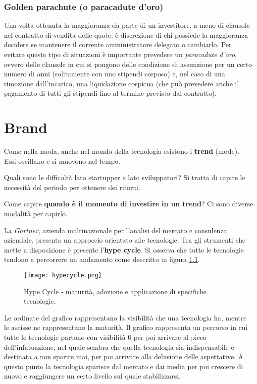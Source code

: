 \subsection{Golden parachute (o paracadute d'oro)}
Una volta ottenuta la maggioranza da parte di un investitore, a meno di
clausole nel contratto di vendita delle quote, è discrezione di chi possiede la
maggioranza decidere se mantenere il corrente amministratore delegato o
cambiarlo. Per evitare questo tipo di situazioni è importante prevedere un
\textit{paracadute d'oro}, ovvero delle clausole in cui si pongono delle
condizione di assunzione per un certo numero di anni (solitamente con uno
stipendi corposo) e, nel caso di una rimozione dall'incarico, una liquidazione
cospicua (che può prevedere anche il pagamento di tutti gli stipendi fino al
termine previsto dal contratto).

\chapter{Brand}

Come nella moda, anche nel mondo della tecnologia esistono i \textbf{trend}
(mode). Essi oscillano e si muovono nel tempo.

Quali sono le difficoltà lato startupper e lato sviluppatori? Si tratta di
capire le necessità del periodo per ottenere dei ritorni.

Come capire \textbf{quando è il momento di investire in un trend}?
Ci sono diverse modalità per capirlo.

La \textit{Gartner}, azienda multinazionale per l'analisi del mercato e
consulenza aziendale, presenta un approccio orientato alle tecnologie. Tra gli
strumenti che mette a disposizione è presente l'\textbf{hype cycle}.
Si osserva che tutte le tecnologie tendono a percorrere un andamento come
descritto in figura \ref{fig:hypecycle}.

\begin{figure}[H]
\centering
\texttt{[image: hypecycle.png]}
\caption[Grafico Hype Cycle]{Hype Cycle - maturità, adozione e applicazione di
specifiche tecnologie.}
\label{fig:hypecycle}
\end{figure}

Le ordinate del grafico rappresentano la visibilità che una tecnologia ha,
mentre le ascisse ne rappresentano la maturità.
Il grafico rappresenta un percorso in cui tutte le tecnologie partono con
visibilità 0 per poi arrivare al picco dell'infatuazione, nel quale sembra che
quella tecnologia sia indispensabile e destinata a non sparire mai,
per poi arrivare alla delusione delle aspettative.
A questo punto la tecnologia sparisce dal mercato e dai media per poi crescere
di nuovo e raggiungere un certo livello sul quale stabilizzarsi.

